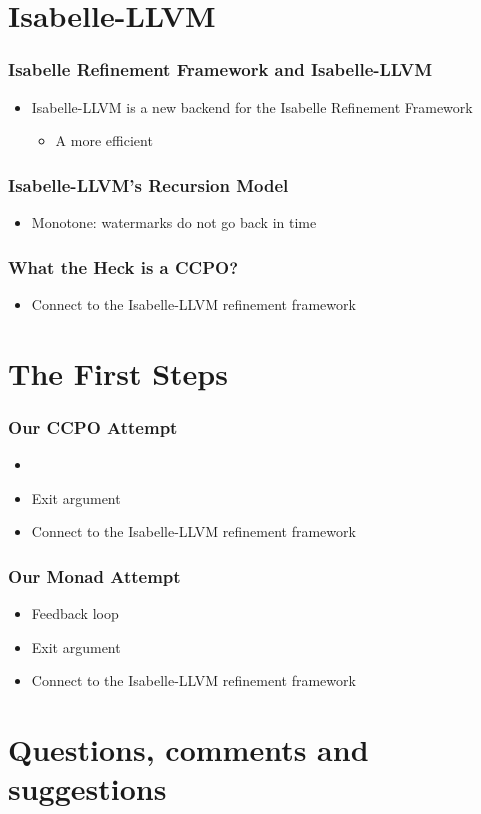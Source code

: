 \documentclass[aspectratio=169,10pt]{beamer}
\begin{document}
\section{Isabelle-LLVM}

\begin{frame}[fragile]
  \frametitle{Isabelle Refinement Framework and Isabelle-LLVM}
  \begin{itemize}
    \item Isabelle-LLVM is a new backend for the Isabelle Refinement Framework
          \begin{itemize}
            \item A more efficient
          \end{itemize}
  \end{itemize}
\end{frame}

\begin{frame}[fragile]
  \frametitle{Isabelle-LLVM's Recursion Model}
  \begin{itemize}
    \item Monotone: watermarks do not go back in time
  \end{itemize}
\end{frame}

\begin{frame}[fragile]
  \frametitle{What the Heck is a CCPO?}
  \begin{itemize}
    \item Connect to the Isabelle-LLVM refinement framework
  \end{itemize}
\end{frame}

\section{The First Steps}

\begin{frame}[fragile]
  \frametitle{Our CCPO Attempt}
  \begin{itemize}
    \item
    \item Exit argument
    \item Connect to the Isabelle-LLVM refinement framework
  \end{itemize}
\end{frame}

\begin{frame}[fragile]
  \frametitle{Our Monad Attempt}
  \begin{itemize}
    \item Feedback loop
    \item Exit argument
    \item Connect to the Isabelle-LLVM refinement framework
  \end{itemize}
\end{frame}

\section{Questions, comments and suggestions}
\end{document}

